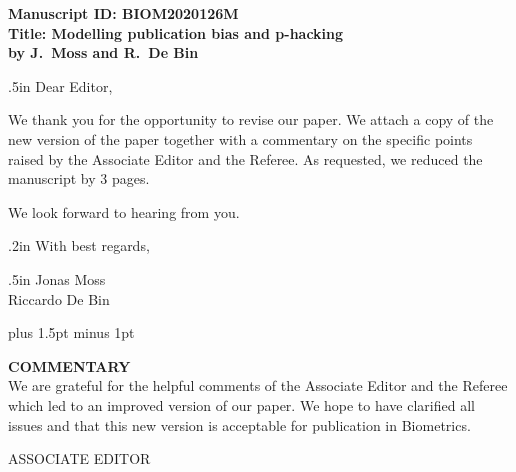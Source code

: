 \documentclass[11pt]{article}
\begin{document}
{\bf
\noindent Manuscript ID:  BIOM2020126M  \\
Title: Modelling publication bias and p-hacking \\
by J.\ Moss and R.\ De Bin}


\vglue .5in \noindent Dear Editor,


\vspace{0.5cm}

\noindent We thank you for the opportunity to revise our paper. We attach a copy of the new  version of the paper together with a commentary on the specific points raised by the Associate Editor and the Referee. As requested, we reduced the manuscript by 3 pages.


\vspace{0.3cm}

\noindent We look forward to hearing from you.%

\vglue .2in \noindent With best regards,

\vglue .5in
\noindent 
Jonas Moss\\
Riccardo De Bin \\

\pagestyle{empty}
\newpage



\parindent=0pt
\parskip=4pt plus 1.5pt minus 1pt


{\bf COMMENTARY} \\

We are grateful for the helpful comments of the Associate Editor and the Referee which led to an improved version of our paper. We hope to have clarified all issues and that this new version is acceptable for publication in Biometrics.

\vspace{2cm}

\begin{center}
ASSOCIATE EDITOR
\end{center}
\end{document}
